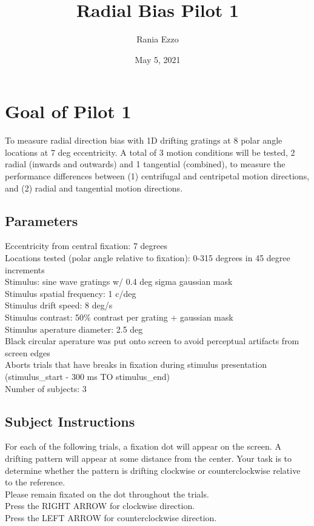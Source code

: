 \documentclass[11pt]{article} %
\title{Radial Bias Pilot 1}
\date{May 5, 2021}
\author{Rania Ezzo}
\begin{document}
\maketitle
\tableofcontents


\section{Goal of Pilot 1}
To measure radial direction bias with 1D drifting gratings at 8 polar angle locations at 7 deg eccentricity. A total of 3 motion conditions will be tested, 2 radial (inwards and outwards) and 1 tangential (combined), to measure the performance differences between (1) centrifugal and centripetal motion directions, and (2) radial and tangential motion directions. 

\subsection{Parameters}
Eccentricity from central fixation: 7 degrees
\\
Locations tested (polar angle relative to fixation): 0-315 degrees in 45 degree increments
\\
Stimulus: sine wave gratings w/ 0.4 deg sigma gaussian mask
\\
Stimulus spatial frequency: 1 c/deg
\\
Stimulus drift speed: 8 deg/s
\\
Stimulus contrast: 50\% contrast per grating + gaussian mask
\\
Stimulus aperature diameter: 2.5 deg
\\
Black circular aperature was put onto screen to avoid perceptual artifacts from screen edges
\\
Aborts trials that have breaks in fixation during stimulus presentation (stimulus\_start - 300 ms TO stimulus\_end)
\\
Number of subjects: 3

\subsection{Subject Instructions}
For each of the following trials, a fixation dot will appear on the screen. A drifting pattern will appear at some distance from the center. Your task is to determine whether the pattern is drifting clockwise or counterclockwise relative to the reference.
\\
Please remain fixated on the dot throughout the trials.
\\
Press the RIGHT ARROW for clockwise direction.
\\
Press the LEFT ARROW for counterclockwise direction.
\end{document}
